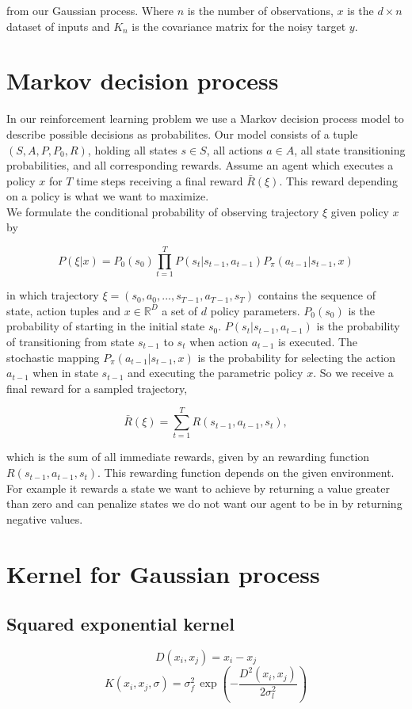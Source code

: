 from our Gaussian process. Where $n$ is the number of observations, $x$ is the $d \times n$ dataset of inputs and $K_n$ is the covariance matrix for the noisy target $y$.


\section{Markov decision process}
In our reinforcement learning problem we use a Markov decision process model to describe possible decisions as probabilites. Our model consists of a tuple $(S,A,P,P_{0},R)$, holding all states $s \in S$, all actions $a \in A$, all state transitioning probabilities, and all corresponding rewards. Assume an agent which executes a policy $x$ for $T$ time steps receiving a final reward $\bar{R}(\xi)$. This reward depending on a policy is what we want to maximize.\\
We formulate the conditional probability of observing trajectory $\xi$ given policy $x$ by

$$P(\xi|x) = P_{0}(s_{0}) \prod_{t=1}^{T} P(s_{t}|s_{t-1}, a_{t-1}) P_{\pi}(a_{t-1}|s_{t-1}, x)$$

in which trajectory $\xi=(s_{0},a_{0}, ..., s_{T-1}, a_{T-1}, s_{T})$ contains the sequence of state, action tuples and $x \in \mathbb{R}^{D}$ a set of $d$ policy parameters. $P_{0}(s_{0})$ is the probability of starting in the initial state $s_{0}$. $P(s_{t}|s_{t-1}, a_{t-1})$ is the probability of transitioning from state $s_{t-1}$ to $s_{t}$ when action $a_{t-1}$ is executed. The stochastic mapping $P_{\pi}(a_{t-1}|s_{t-1},x)$ is the probability for selecting the action $a_{t-1}$ when in state $s_{t-1}$ and executing the parametric policy $x$. So we receive a final reward for a sampled trajectory,

$$\bar{R}(\xi)=\sum_{t=1}^T R(s_{t-1}, a_{t-1}, s_{t}),$$

which is the sum of all immediate rewards, given by an rewarding function $R(s_{t-1}, a_{t-1}, s_{t})$. This rewarding function depends on the given environment. For example it rewards a state we want to achieve by returning a value greater than zero and can penalize states we do not want our agent to be in by returning negative values.

\section{Kernel for Gaussian process}
\subsection{Squared exponential kernel}
$$D(x_i,x_j) = x_i-x_j$$
$$K(x_i,x_j,\sigma) = \sigma_{f}^{2}\,\exp\left(-\frac{D^2(x_i,x_j)}{2\sigma_l^2} \right) $$
